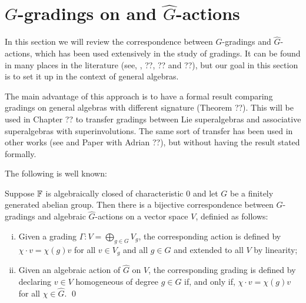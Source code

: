 
\section{\texorpdfstring{$G$}{G}-gradings on and \texorpdfstring{$\widehat{G}$}{G-hat}-actions}\label{sec:g-hat-action}

In this section we will review the correspondence between $G$-gradings and $\widehat G$-actions, which has been used extensively in the study of gradings.
It can be found in many places in the literature (see, \eg, ??, ?? and ??), but our goal in this section is to set it up in the context of general algebras.

The main advantage of this approach is to have a formal result comparing gradings on general algebras with different signature (Theorem ??).
This will be used in Chapter ?? to transfer gradings between Lie superalgebras and associative superalgebras with superinvolutions.
The same sort of transfer has been used in other works (see \cite{livromicha} and Paper with Adrian ??), but without having the result stated formally.


The following is well known:

\begin{thm}\label{thm:g-hat-correspondence}
	Suppose $\mathbb{F}$ is algebraically closed of characteristic $0$ and let $G$ be a finitely generated abelian group.
	Then there is a bijective correspondence between $G$-gradings and algebraic $\widehat G$-actions on a vector space $V$, definied as follows:
	\begin{enumerate}[(i)]
		\item Given a grading $\Gamma: V = \bigoplus_{g\in G} V_g$, the corresponding action is defined by $\chi\cdot v = \chi(g) v$ for all $v\in V_g$ and all $g\in G$ and extended to all $V$ by linearity;
		\item Given an algebraic action of $\widehat G$ on $V$, the corresponding grading is defined by declaring $v\in V$ homogeneous of degree $g\in G$ if, and only if, $\chi\cdot v = \chi(g) v$ for all $\chi \in \widehat G$. \label{item:action-to-grading} \qed
	\end{enumerate}
\end{thm}

